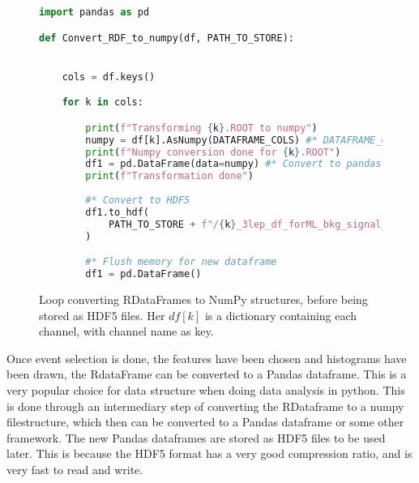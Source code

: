 \begin{figure}[H]
    \centering
\begin{lstlisting}[language=Python, style=pythonstyle, label={code:python_func_example_2}]
import pandas as pd 

def Convert_RDF_to_numpy(df, PATH_TO_STORE):


    cols = df.keys()

    for k in cols:

        print(f"Transforming {k}.ROOT to numpy")
        numpy = df[k].AsNumpy(DATAFRAME_COLS) #* DATAFRAME_COLS is a list of columns to be converted to a numpy array
        print(f"Numpy conversion done for {k}.ROOT")
        df1 = pd.DataFrame(data=numpy) #* Convert to pandas dataframe
        print(f"Transformation done")
        
        #* Convert to HDF5
        df1.to_hdf(
            PATH_TO_STORE + f"/{k}_3lep_df_forML_bkg_signal_fromRDF.hdf5", "mini"
        )

        #* Flush memory for new dataframe
        df1 = pd.DataFrame()

\end{lstlisting}
\caption[Conversion from RDataFrame to NumPy]{Loop converting RDataFrames to NumPy structures, before being stored as HDF5 files.
Her $df[k]$ is a dictionary containing each channel, with channel name as key.}
\end{figure}

Once event selection is done, the features have been chosen and histograms have been 
drawn, the RdataFrame can be converted to a Pandas dataframe. This is a very popular 
choice for data structure when doing data analysis in python. This is done through an 
intermediary step of converting the RDataframe to a numpy filestructure, which then can 
be converted to a Pandas\cite{reback2020pandas} dataframe or some other framework.
The new Pandas dataframes are stored as HDF5\cite{hdf5} files to be used later. This is 
because the HDF5 format has a very good compression ratio, and is very fast to read and write. 